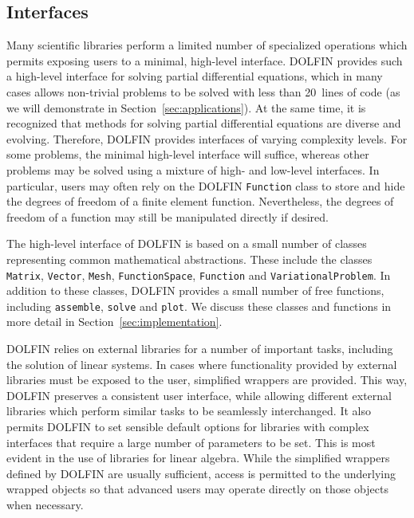 \documentclass[acmtoms]{acmtrans2m}
\newcommand{\emp}[1]{\texttt{#1}}
\newcommand{\dolfin}{DOLFIN}
\begin{document}
\subsection{Interfaces}
\label{sec:interfaces}

Many scientific libraries perform a limited number of specialized
operations which permits exposing users to a minimal, high-level
interface. \dolfin{} provides such a high-level interface for solving
partial differential equations, which in many cases allows non-trivial
problems to be solved with less than 20~lines of code (as we will
demonstrate in Section~\ref{sec:applications}). At the same time, it
is recognized that methods for solving partial differential equations
are diverse and evolving. Therefore, \dolfin{} provides interfaces of
varying complexity levels. For some problems, the minimal high-level
interface will suffice, whereas other problems may be solved using a
mixture of high- and low-level interfaces. In particular, users may often
rely on the \dolfin{} \emp{Function} class to store and hide the
degrees of freedom of a finite element function. Nevertheless, the
degrees of freedom of a function may still be manipulated directly if
desired.

The high-level interface of \dolfin{} is based on a small number of
classes representing common mathematical abstractions. These include
the classes \emp{Matrix}, \emp{Vector}, \emp{Mesh},
\emp{FunctionSpace}, \emp{Function} and \emp{VariationalProblem}. In
addition to these classes, \dolfin{} provides a small number of free
functions, including \emp{assemble}, \emp{solve} and \emp{plot}. We
discuss these classes and functions in more detail in
Section~\ref{sec:implementation}.

\dolfin{} relies on external libraries for a number of important
tasks, including the solution of linear systems. In cases where
functionality provided by external libraries must be exposed to the
user, simplified wrappers are provided. This way, \dolfin{}
preserves a consistent user interface, while allowing different
external libraries which perform similar tasks to be seamlessly
interchanged. It also permits \dolfin{} to set sensible default
options for libraries with complex interfaces that require a large
number of parameters to be set. This is most evident in the use of
libraries for linear algebra.
While the simplified wrappers
defined by \dolfin{} are usually sufficient, access is permitted to the
underlying wrapped objects so that advanced users may operate directly
on those objects when necessary.
\end{document}
